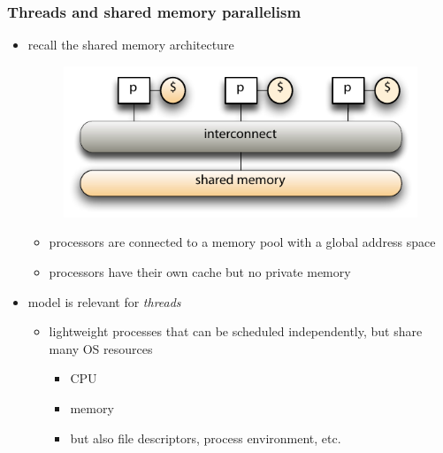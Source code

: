 %
%
%
%


\begin{frame}[fragile]
%
  \frametitle{Threads and shared memory parallelism}
%
  \begin{itemize}
%
  \item recall the shared memory architecture
%
    \begin{figure}
      \centering
      \includegraphics[scale=0.5]{figures/shared-memory.pdf}
    \end{figure}
    \vspace{-1.0em}
%
    \begin{itemize}
    \item processors are connected to a memory pool with a global address space
    \item processors have their own cache but no private memory
    \end{itemize}
%
  \item model is relevant for {\em threads}
%
    \begin{itemize}
    \item lightweight processes that can be scheduled independently, but share many OS
      resources
      \begin{itemize}
      \item CPU
      \item memory
      \item but also file descriptors, process environment, etc.
      \end{itemize}

\end{itemize}
\end{itemize}
\end{frame}

